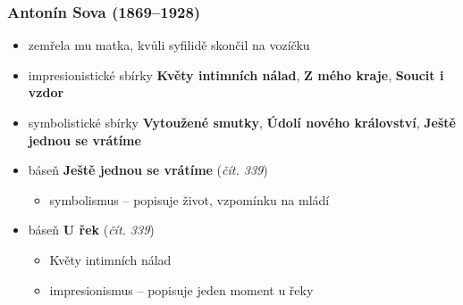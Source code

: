 \subsubsection{Antonín Sova (1869--1928)}
\begin{itemize}
\item zemřela mu matka, kvůli syfilidě skončil na vozíčku
\item impresionistické sbírky \textbf{Květy intimních nálad}, \textbf{Z mého kraje}, \textbf{Soucit i vzdor}
\item symbolistické sbírky \textbf{Vytoužené smutky}, \textbf{Údolí nového království}, \textbf{Ještě jednou se vrátíme}
\item báseň \textbf{Ještě jednou se vrátíme} (\textit{čít. 339})
	\begin{itemize}
	\item symbolismus -- popisuje život, vzpomínku na mládí
	\end{itemize}
\item báseň \textbf{U řek} (\textit{čít. 339})
	\begin{itemize}
	\item Květy intimních nálad
	\item impresionismus -- popisuje jeden moment u řeky
	\end{itemize}
\end{itemize}


